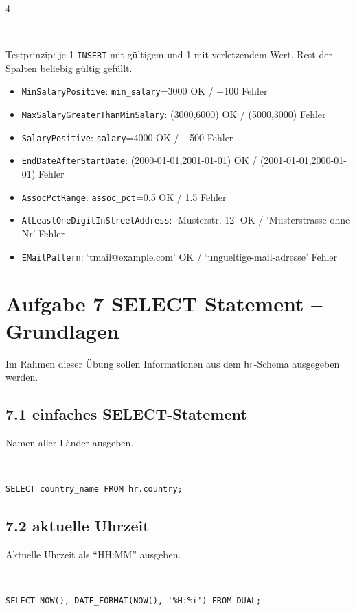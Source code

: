 \documentclass[8pt,a4paper]{extarticle}
\newcommand{\Kopf}[1]{}
\newenvironment{loesung}[1][]{%
    \par\noindent{\bfseries\color{loesungrahmen}\small$\blacktriangleright$~L\"osung#1:}~%
}{\par\smallskip}
\begin{document}
\begin{multicols}{4}
\begin{loesung}
Testprinzip: je 1 \texttt{INSERT} mit g\"ultigem und 1 mit verletzendem Wert, Rest der Spalten beliebig g\"ultig gef\"ullt.
\begin{itemize}
\item \texttt{MinSalaryPositive}: \texttt{min\_salary}=3000 OK / $-$100 Fehler
\item \texttt{MaxSalaryGreaterThanMinSalary}: (3000,6000) OK / (5000,3000) Fehler
\item \texttt{SalaryPositive}: \texttt{salary}=4000 OK / $-$500 Fehler
\item \texttt{EndDateAfterStartDate}: (2000-01-01,2001-01-01) OK / (2001-01-01,2000-01-01) Fehler
\item \texttt{AssocPctRange}: \texttt{assoc\_pct}=0.5 OK / 1.5 Fehler
\item \texttt{AtLeastOneDigitInStreetAddress}: `Musterstr. 12' OK / `Musterstrasse ohne Nr' Fehler
\item \texttt{EMailPattern}: `tmail@example.com' OK / `ungueltige-mail-adresse' Fehler
\end{itemize}
\end{loesung}


\section*{Aufgabe 7 \quad SELECT Statement -- Grundlagen}
\Kopf{Aufgabe 7 SELECT Statement - Grundlagen}

Im Rahmen dieser \"Ubung sollen Informationen aus dem \texttt{hr}-Schema ausgegeben werden.

\subsection*{7.1 \quad einfaches SELECT-Statement}
Namen aller L\"ander ausgeben.
\begin{loesung}
\begin{lstlisting}
SELECT country_name FROM hr.country;
\end{lstlisting}
\end{loesung}

\subsection*{7.2 \quad aktuelle Uhrzeit}
Aktuelle Uhrzeit als ``HH:MM'' ausgeben.
\begin{loesung}
\begin{lstlisting}
SELECT NOW(), DATE_FORMAT(NOW(), '%H:%i') FROM DUAL;
\end{lstlisting}
\end{loesung}


\end{multicols}
\end{document}
